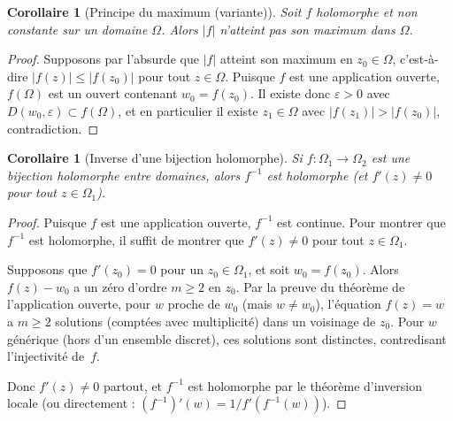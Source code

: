 \documentclass[12pt,a4paper,openany]{book}
\theoremstyle{definition}
\theoremstyle{plain}
\newtheorem{corollaire}[definition]{Corollaire}
\theoremstyle{remark}
\newcommand{\abs}[1]{\left|#1\right|}
\begin{document}
\begin{corollaire}[Principe du maximum (variante)]\label{cor:max-ouvert}
Soit $f$ holomorphe et non constante sur un domaine $\Omega$. Alors $\abs{f}$
n'atteint pas son maximum dans $\Omega$.
\end{corollaire}

\begin{proof}
Supposons par l'absurde que $\abs{f}$ atteint son maximum en $z_0 \in \Omega$,
c'est-à-dire $\abs{f(z)} \leq \abs{f(z_0)}$ pour tout $z \in \Omega$. Puisque
$f$ est une application ouverte, $f(\Omega)$ est un ouvert contenant
$w_0 = f(z_0)$. Il existe donc $\varepsilon > 0$ avec
$D(w_0, \varepsilon) \subset f(\Omega)$, et en particulier il existe $z_1 \in \Omega$
avec $\abs{f(z_1)} > \abs{f(z_0)}$, contradiction.
\end{proof}

\begin{corollaire}[Inverse d'une bijection holomorphe]\label{cor:inverse-holomorphe}
Si $f : \Omega_1 \to \Omega_2$ est une bijection holomorphe entre domaines, alors
$f^{-1}$ est holomorphe (et $f'(z) \neq 0$ pour tout $z \in \Omega_1$).
\end{corollaire}

\begin{proof}
Puisque $f$ est une application ouverte, $f^{-1}$ est continue. Pour montrer
que $f^{-1}$ est holomorphe, il suffit de montrer que $f'(z) \neq 0$ pour tout
$z \in \Omega_1$.

Supposons que $f'(z_0) = 0$ pour un $z_0 \in \Omega_1$, et soit $w_0 = f(z_0)$.
Alors $f(z) - w_0$ a un zéro d'ordre $m \geq 2$ en $z_0$. Par la preuve du
théorème de l'application ouverte, pour $w$ proche de $w_0$ (mais $w \neq w_0$),
l'équation $f(z) = w$ a $m \geq 2$ solutions (comptées avec multiplicité) dans
un voisinage de $z_0$. Pour $w$ générique (hors d'un ensemble discret), ces
solutions sont distinctes, contredisant l'injectivité de~$f$.

Donc $f'(z) \neq 0$ partout, et $f^{-1}$ est holomorphe par le théorème
d'inversion locale (ou directement : $(f^{-1})'(w) = 1/f'(f^{-1}(w))$).
\end{proof}
\end{document}
